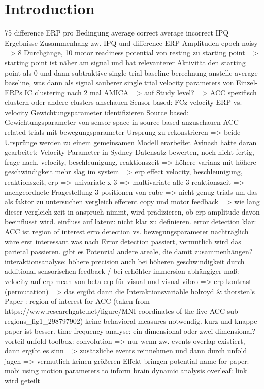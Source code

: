 \section{Introduction}

75 difference ERP pro Bedingung
average correct
average incorrect
IPQ Ergebnisse
Zusammenhang zw. IPQ und difference ERP Amplituden
epoch noisy => 8 Durchgänge, 10%
motor readiness potential von resting zu starting point
=> starting point ist näher am signal und hat relevanterer Aktivität
den starting point als 0 und dann subtraktive single trial baseline berechnung
anstelle average baseline, was dann als signal sauberer
single trial velocity parameters von Einzel-ERPs
IC clustering nach 2 mal AMICA
=> auf Study level?
=> ACC spezifisch clustern oder andere clusters anschauen
Sensor-based:
FCz velocity ERP vs. velocity
Gewichtungsparameter identifizieren
Source based:
Gewichtungsparameter von sensor-space in source-based anzuschauen
ACC related trials mit bewegungsparameter
Ursprung zu rekonstrieren
=> beide Ursprünge werden zu einem gemeinsamen Modell erarbeitet
Avinash hatte daran gearbeitet: Velocity Parameter in Sydney Datensatz bewerten, noch nicht fertig, frage nach.
velocity, beschleunigung, reaktionszeit
=> höhere varianz mit höhere geschwindigkeit mehr slag im system => erp effect
velocity, beschleunigung, reaktionszeit, erp
=> univariate x 3
=> multivariate alle 3
reaktionszeit => nachgeordnete Fragestellung
3 positionen von cube => nicht genug trials um das als faktor zu untersuchen
vergleich efferent copy und motor feedback => wie lang dieser vergleich zeit in anspruch nimmt, wird prädizieren, ob erp amplitude davon beeinflusst wird.
einfluss auf latenz: nicht klar zu definieren.
error detection klar: ACC ist region of interest
erro detection vs. bewegungsparameter
nachträglich wäre erst interessant was nach Error detection passiert, vermutlich wird das parietal passieren. gibt es Potenzial andere areale, die damit zusammenhängen?
interaktionsanalyse:
höhere precision auch bei höheren geschwindigkeit durch additional sensorischen feedback / bei erhöhter immersion
abhängiger maß: velocity auf erp
mean von beta-erp für visual und visual vibro
=> erp kontrast (permutation)
=> das ergibt dann die Interaktionsvariable
holroyd & thorsten's Paper : region of interest for ACC (taken from https://www.researchgate.net/figure/MNI-coordinates-of-the-five-ACC-sub-regions_fig1_298797902)
keine behavioral measures notwendig. kurz und knappe paper ist besser.
time-frequency analyse: ein-dimensional oder zwei-dimensional?
vorteil unfold toolbox: convolution
=> nur wenn zw. events overlap existiert, dann ergibt es sinn
=> zusätzliche events reinnehmen und dann durch unfold jagen
=> vermutlich keinen größeren Effekt bringen
potential name for paper: mobi using motion parameters to inform brain dynamic analysis
overleaf: link wird geteilt